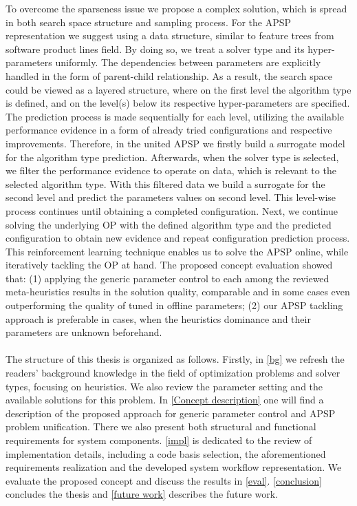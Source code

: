 To overcome the sparseness issue we propose a complex solution, which is spread in both search space structure and sampling process. For the APSP representation we suggest using a data structure, similar to feature trees from software product lines field. By doing so, we treat a solver type and its hyper-parameters uniformly. The dependencies between parameters are explicitly handled in the form of parent-child relationship. As a result, the search space could be viewed as a layered structure, where on the first level the algorithm type is defined, and on the level(s) below its respective hyper-parameters are specified. The prediction process is made sequentially for each level, utilizing the available performance evidence in a form of already tried configurations and respective improvements. Therefore, in the united APSP we firstly build a surrogate model for the algorithm type prediction. Afterwards, when the solver type is selected, we filter the performance evidence to operate on data, which is relevant to the selected algorithm type. With this filtered data we build a surrogate for the second level and predict the parameters values on second level. This level-wise process continues until obtaining a completed configuration. Next, we continue solving the underlying OP with the defined algorithm type and the predicted configuration to obtain new evidence and repeat configuration prediction process. This reinforcement learning technique enables us to solve the APSP online, while iteratively tackling the OP at hand. The proposed concept evaluation showed that: (1) applying the generic parameter control to each among the reviewed meta-heuristics results in the solution quality, comparable and in some cases even outperforming the quality of tuned in offline parameters; (2) our APSP tackling approach is preferable in cases, when the heuristics dominance and their parameters are unknown beforehand.

\paragraph{}
The structure of this thesis is organized as follows. Firstly, in \cref{bg} we refresh the readers' background knowledge in the field of optimization problems and solver types, focusing on heuristics. We also review the parameter setting and the available solutions for this problem. In \cref{Concept description} one will find a description of the proposed approach for generic parameter control and APSP problem unification. There we also present both structural and functional requirements for system components. \cref{impl} is dedicated to the review of implementation details, including a code basis selection, the aforementioned requirements realization and the developed system workflow representation. We evaluate the proposed concept and discuss the results in \cref{eval}. \cref{conclusion} concludes the thesis and \cref{future work} describes the future work.
